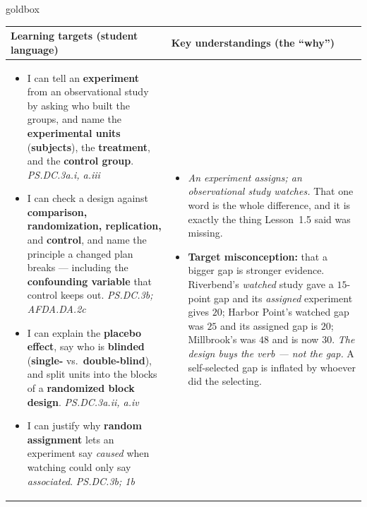 \documentclass[10pt]{article}
\begin{document}
\renewcommand{\arraystretch}{1.4}
\boxguard
\begin{skillbox}{goldbox}
\begin{tabularx}{\linewidth}{@{}X|X@{}}
\textbf{Learning targets (student language)} & \textbf{Key understandings (the ``why'')} \\[2pt]
\hline
\vspace{-6pt}
\begin{itemize}[leftmargin=1.1em, nosep, after=\vspace{2pt}]
  \item I can tell an \textbf{experiment} from an observational study by asking who built the
        groups, and name the \textbf{experimental units} (\textbf{subjects}), the
        \textbf{treatment}, and the \textbf{control group}.
        \hfill \textit{PS.DC.3a.i, a.iii}
  \item I can check a design against \textbf{comparison, randomization, replication,} and
        \textbf{control}, and name the principle a changed plan breaks --- including the
        \textbf{confounding variable} that control keeps out.
        \hfill \textit{PS.DC.3b; AFDA.DA.2c}
  \item I can explain the \textbf{placebo effect}, say who is \textbf{blinded}
        (\textbf{single-} vs.\ \textbf{double-blind}), and split units into the blocks of a
        \textbf{randomized block design}. \hfill \textit{PS.DC.3a.ii, a.iv}
  \item I can justify why \textbf{random assignment} lets an experiment say \emph{caused}
        when watching could only say \emph{associated}. \hfill \textit{PS.DC.3b; 1b}
\end{itemize}
&
\vspace{-6pt}
\begin{itemize}[leftmargin=1.1em, nosep, after=\vspace{2pt}]
  \item \emph{An experiment assigns; an observational study watches.} That one word is the
        whole difference, and it is exactly the thing Lesson~1.5 said was missing.
  \item \textbf{Target misconception:} that a bigger gap is stronger evidence. Riverbend's
        \emph{watched} study gave a $15$-point gap and its \emph{assigned} experiment gives
        $20$; Harbor Point's watched gap was $25$ and its assigned gap is $20$; Millbrook's
        was $48$ and is now $30$. \emph{The design buys the verb --- not the gap.} A
        self-selected gap is inflated by whoever did the selecting.

\end{itemize}
\end{tabularx}
\end{skillbox}
\end{document}
